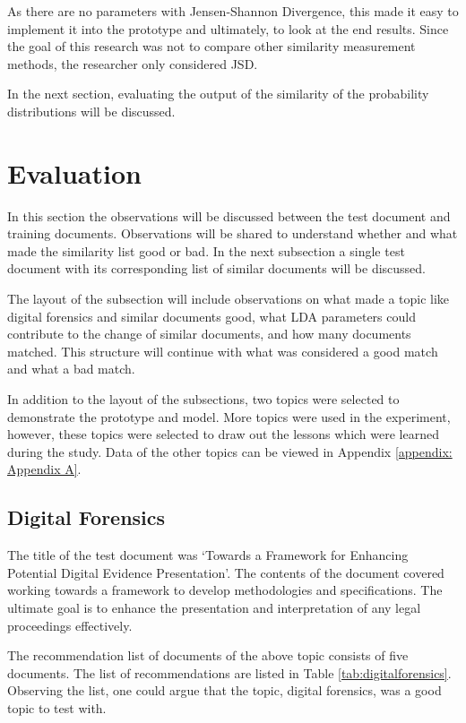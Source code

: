 As there are no parameters with Jensen-Shannon Divergence, this made it easy to implement it into the prototype and ultimately, to look at the end results. Since the goal of this research was not to compare other similarity measurement methods, the researcher only considered JSD.

In the next section, evaluating the output of the similarity of the probability distributions will be discussed.

\section{Evaluation} \label{ssec:eval}

In this section the observations will be discussed between the test document and training documents. Observations will be shared to understand whether and what made the similarity list good or bad. In the next subsection a single test document with its corresponding list of similar documents will be discussed. 

The layout of the subsection will include observations on what made a topic like digital forensics and similar documents good, what LDA parameters could contribute to the change of similar documents, and how many documents matched. This structure will continue with what was considered a good match and what a bad match.

In addition to the layout of the subsections, two topics were selected to demonstrate the prototype and model. More topics were used in the experiment, however, these topics were selected to draw out the lessons which were learned during the study. Data of the other topics can be viewed in Appendix \ref{appendix: Appendix A}.

\subsection{Digital Forensics}

The title of the test document was ‘Towards a Framework for Enhancing Potential Digital Evidence Presentation’. The contents of the document covered working towards a framework to develop methodologies and specifications. The ultimate goal is to enhance the presentation and interpretation of any legal proceedings effectively.

The recommendation list of documents of the above topic consists of five documents. The list of recommendations are listed in Table \ref{tab:digitalforensics}. Observing the list, one could argue that the topic, digital forensics, was a good topic to test with.

